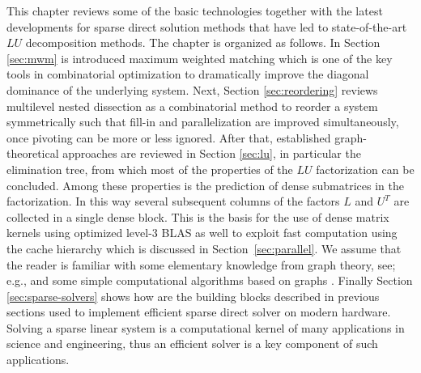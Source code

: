 This chapter reviews some of the basic technologies together
with the latest developments for sparse direct solution methods that have led to
state-of-the-art $LU$ decomposition methods.
The chapter is organized as follows. In Section \ref{sec:mwm}
is introduced maximum weighted matching which is one of the key
tools in combinatorial optimization to dramatically improve the diagonal dominance
of the underlying system.
Next, Section \ref{sec:reordering} reviews multilevel nested dissection
as a combinatorial method to reorder a system symmetrically
such that fill-in and parallelization are improved simultaneously, once
pivoting can be more or less ignored.
After that, established graph-theoretical approaches are reviewed
in Section \ref{sec:lu}, in particular the elimination tree, from which
most of the properties of the $LU$ factorization can be concluded. Among
these properties is the prediction of dense submatrices in the
factorization. In this way several subsequent
columns of the factors $L$ and $U^T$ are collected in a single dense block. 
This is the basis for the use of dense matrix kernels using optimized
level-3 BLAS as well to exploit fast computation using the cache hierarchy which 
is discussed in Section~\ref{sec:parallel}.
We assume that the reader
 is familiar with some elementary knowledge from
graph theory, see; e.g., \cite{doi:10.1137/1.9780898718881} and some simple
computational algorithms based on graphs \cite{AhoHU83}.
Finally Section \ref{sec:sparse-solvers} shows how are the building blocks described in previous sections used to implement efficient sparse direct solver on modern hardware. Solving a sparse linear system is a computational kernel of many applications in science and engineering, thus an efficient solver is a key component of such applications.

